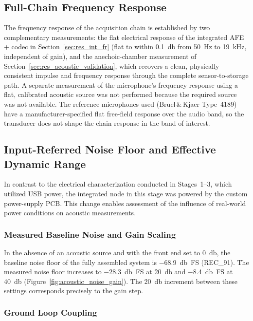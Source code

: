 \subsection{Full-Chain Frequency Response}
\label{sec:res_acoustic_fr}
The frequency response of the acquisition chain is established by two complementary measurements: the flat electrical response of the integrated AFE + codec in Section~\ref{sec:res_int_fr} (flat to within \SI{0.1}{\decibel} from \SI{50}{\hertz} to \SI{19}{\kilo\hertz}, independent of gain), and the anechoic-chamber measurement of Section~\ref{sec:res_acoustic_validation}, which recovers a clean, physically consistent impulse and frequency response through the complete sensor-to-storage path. A separate measurement of the microphone's frequency response using a flat, calibrated acoustic source was not performed because the required source was not available. The reference microphones used (Bruel\,\&\,Kjaer Type~4189) have a manufacturer-specified flat free-field response over the audio band, so the transducer does not shape the chain response in the band of interest.

\subsection{Input-Referred Noise Floor and Effective Dynamic Range}
\label{sec:res_acoustic_noise}

In contrast to the electrical characterization conducted in Stages~1--3, which utilized USB power, the integrated node in this stage was powered by the custom power-supply PCB. This change enables assessment of the influence of real-world power conditions on acoustic measurements. 

\subsubsection{Measured Baseline Noise and Gain Scaling} 

In the absence of an acoustic source and with the front end set to \SI{0}{\decibel}, the baseline noise floor of the fully assembled system is \SI{-68.9}{\decibel FS} (REC\_91). The measured noise floor increases to \SI{-28.3}{\decibel FS} at \SI{+20}{\decibel} and \SI{-8.4}{\decibel FS} at \SI{+40}{\decibel} (Figure~\ref{fig:acoustic_noise_gain}). The \SI{20}{\decibel} increment between these settings corresponds precisely to the gain step.

 \subsubsection{Ground Loop Coupling} 

